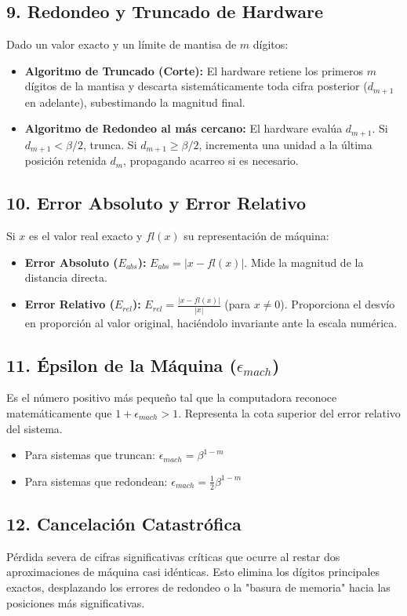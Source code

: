 \documentclass[12pt]{article}
\begin{document}
\subsection*{9. Redondeo y Truncado de Hardware}
Dado un valor exacto y un límite de mantisa de $m$ dígitos:
\begin{itemize}
    \item \textbf{Algoritmo de Truncado (Corte):} El hardware retiene los primeros $m$ dígitos de la mantisa y descarta sistemáticamente toda cifra posterior ($d_{m+1}$ en adelante), subestimando la magnitud final.
    \item \textbf{Algoritmo de Redondeo al más cercano:} El hardware evalúa $d_{m+1}$. Si $d_{m+1} < \beta/2$, trunca. Si $d_{m+1} \ge \beta/2$, incrementa una unidad a la última posición retenida $d_m$, propagando acarreo si es necesario.
\end{itemize}

\subsection*{10. Error Absoluto y Error Relativo}
Si $x$ es el valor real exacto y $fl(x)$ su representación de máquina:
\begin{itemize}
    \item \textbf{Error Absoluto ($E_{abs}$):} $E_{abs} = |x - fl(x)|$. Mide la magnitud de la distancia directa.
    \item \textbf{Error Relativo ($E_{rel}$):} $E_{rel} = \frac{|x - fl(x)|}{|x|}$ (para $x \neq 0$). Proporciona el desvío en proporción al valor original, haciéndolo invariante ante la escala numérica.
\end{itemize}

\subsection*{11. Épsilon de la Máquina ($\epsilon_{mach}$)}
Es el número positivo más pequeño tal que la computadora reconoce matemáticamente que $1 + \epsilon_{mach} > 1$. Representa la cota superior del error relativo del sistema.
\begin{itemize}
    \item Para sistemas que truncan: $\epsilon_{mach} = \beta^{1-m}$
    \item Para sistemas que redondean: $\epsilon_{mach} = \frac{1}{2} \beta^{1-m}$
\end{itemize}

\subsection*{12. Cancelación Catastrófica}
Pérdida severa de cifras significativas críticas que ocurre al restar dos aproximaciones de máquina casi idénticas. Esto elimina los dígitos principales exactos, desplazando los errores de redondeo o la "basura de memoria" hacia las posiciones más significativas.
\end{document}
